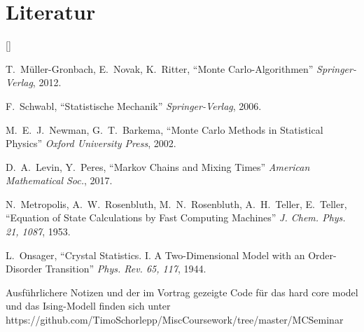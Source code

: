 \documentclass[twoside]{article}
\def\beginrefs{\begin{list}%
        {[\arabic{equation}]}{\usecounter{equation}
         \setlength{\leftmargin}{2.0truecm}\setlength{\labelsep}{0.4truecm}%
         \setlength{\labelwidth}{1.6truecm}}}
\def\endrefs{\end{list}}
\def\bibentry#1{\item[\hbox{[#1]}]}
\theoremstyle{definition}
\begin{document}
\section*{Literatur}
\beginrefs
\bibentry{1}{\sc T.~Müller-Gronbach, E.~Novak, K.~Ritter}, 
``Monte Carlo-Algorithmen''
{\it Springer-Verlag},
2012.
\bibentry{2}{\sc F.~Schwabl}, 
``Statistische Mechanik''
{\it Springer-Verlag},
2006.
\bibentry{3}{\sc M.~E.~J.~Newman, G.~T.~Barkema}, 
``Monte Carlo Methods in Statistical Physics''
{\it Oxford University Press},
2002.
\bibentry{4}{\sc D.~A.~Levin, Y.~Peres}, 
``Markov Chains and Mixing Times''
{\it American Mathematical Soc.},
2017.
\bibentry{5}{\sc N.~Metropolis, A.~W.~Rosenbluth, M.~N.~Rosenbluth, A.~H.~Teller, E.~Teller}, 
``Equation of State Calculations by Fast Computing Machines''
{\it  J. Chem. Phys. 21, 1087},
1953.
\bibentry{6}{\sc L.~Onsager}, 
``Crystal Statistics. I. A Two-Dimensional Model with an Order-Disorder Transition''
{\it Phys. Rev. 65, 117},
1944.
\bibentry{7}{} Ausführlichere Notizen und der im Vortrag gezeigte Code für das hard core model und das Ising-Modell finden sich unter https://github.com/TimoSchorlepp/MiscCoursework/tree/master/MCSeminar
\endrefs
\end{document}
